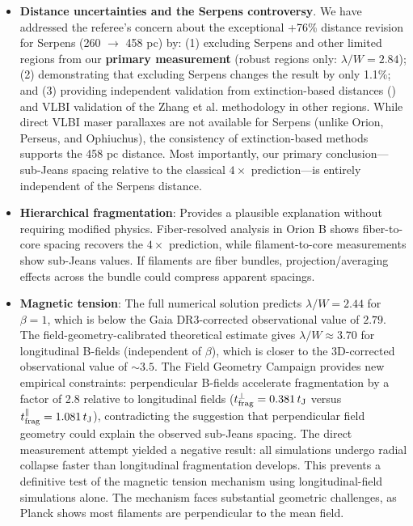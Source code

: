 \documentclass[twoside,twocolumn]{mnras}
\begin{document}
\begin{itemize}
    \item \textbf{Distance uncertainties and the Serpens controversy}. We have addressed the referee's concern about the exceptional +76\% distance revision for Serpens (260 $\to$ 458 pc) by: (1) excluding Serpens and other limited regions from our \textbf{primary measurement} (robust regions only: $\lambda/W = 2.84$); (2) demonstrating that excluding Serpens changes the result by only 1.1\%; and (3) providing independent validation from extinction-based distances (\citet{Yan2022, Green2024}) and VLBI validation of the Zhang et al. methodology in other regions. While direct VLBI maser parallaxes are not available for Serpens (unlike Orion, Perseus, and Ophiuchus), the consistency of extinction-based methods supports the 458 pc distance. Most importantly, our primary conclusion—sub-Jeans spacing relative to the classical $4\times$ prediction—is entirely independent of the Serpens distance.

    \item \textbf{Hierarchical fragmentation}: Provides a plausible explanation without requiring modified physics. Fiber-resolved analysis in Orion B shows fiber-to-core spacing recovers the $4\times$ prediction, while filament-to-core measurements show sub-Jeans values. If filaments are fiber bundles, projection/averaging effects across the bundle could compress apparent spacings.

    \item \textbf{Magnetic tension}: The full numerical solution predicts $\lambda/W = 2.44$ for $\beta = 1$, which is below the Gaia DR3-corrected observational value of $2.79$. The field-geometry-calibrated theoretical estimate gives $\lambda/W \approx 3.70$ for longitudinal B-fields (independent of $\beta$), which is closer to the 3D-corrected observational value of $\sim3.5$. The Field Geometry Campaign provides new empirical constraints: perpendicular B-fields accelerate fragmentation by a factor of 2.8 relative to longitudinal fields ($t_{\rm frag}^{\perp} = 0.381\,t_{\rm J}$ versus $t_{\rm frag}^{\parallel} = 1.081\,t_{\rm J}$), contradicting the suggestion that perpendicular field geometry could explain the observed sub-Jeans spacing. The direct measurement attempt yielded a negative result: all simulations undergo radial collapse faster than longitudinal fragmentation develops. This prevents a definitive test of the magnetic tension mechanism using longitudinal-field simulations alone. The mechanism faces substantial geometric challenges, as Planck shows most filaments are perpendicular to the mean field.


\end{itemize}
\end{document}
